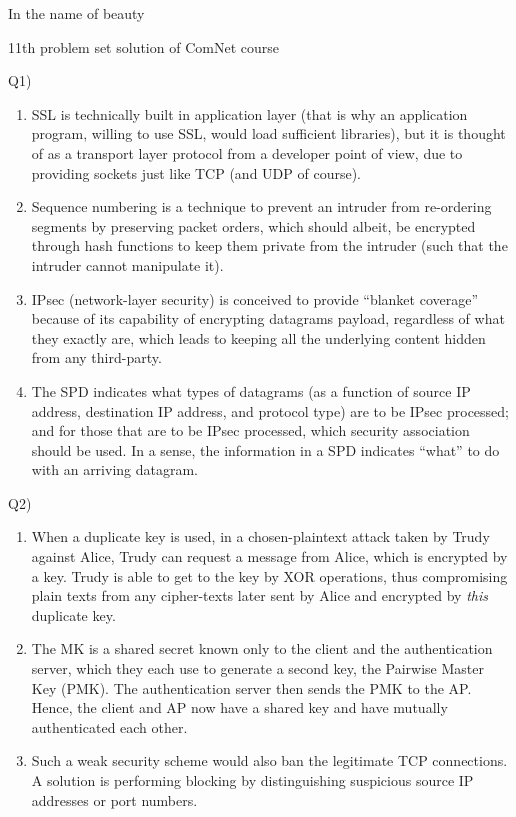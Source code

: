 \documentclass[10pt,letterpaper]{article}
\begin{document}
\Large
\begin{center}
In the name of beauty

11th problem set solution of ComNet course

\hrulefill
\end{center}
Q1) 
\begin{enumerate}[label=\alph*-]
\item
SSL is technically built in application layer (that is why an application program, willing to use SSL, would load sufficient libraries), but it is thought of as a transport layer protocol from a developer point of view, due to providing sockets just like TCP (and UDP of course).
\item
Sequence numbering is a technique to prevent an intruder from re-ordering segments by preserving packet orders, which should albeit, be encrypted through hash functions to keep them private from the intruder (such that the intruder cannot manipulate it).
\item
IPsec (network-layer security) is conceived to provide “blanket coverage” because of its capability of encrypting datagrams payload, regardless of what they exactly are, which leads to keeping all the underlying content hidden from any third-party.
\item
The SPD indicates what types of datagrams (as a function of source IP
address, destination IP address, and protocol type) are to be IPsec processed; and
for those that are to be IPsec processed, which security association should be used. In a sense, the
information in a SPD indicates “what” to do with an arriving datagram.
\end{enumerate}

Q2) 
\begin{enumerate}[label=\alph*-]
\item
When a duplicate key is used, in a chosen-plaintext attack taken by Trudy against Alice, Trudy can request a message from Alice, which is encrypted by a key. Trudy is able to get to the key by XOR operations, thus compromising plain texts from any cipher-texts later sent by Alice and encrypted by \textit{this} duplicate key. 
\item
The MK is a shared secret known
only to the client and the authentication server, which they each use to generate
a second key, the Pairwise Master Key (PMK). The authentication server then
sends the PMK to the AP. Hence, the client and AP
now have a shared key and have mutually authenticated each other.
\item
Such a weak security scheme would also ban the legitimate TCP connections. A solution is performing blocking by distinguishing suspicious source IP addresses or port numbers.
\end{enumerate}
\end{document}
